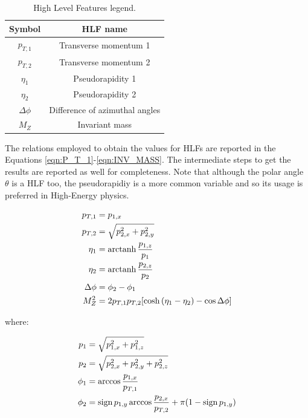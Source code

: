 \begin{table}[H]
	\begin{center}
		\begin{tabular}{c c}
			\toprule
			Symbol	&	HLF name	\\
			\midrule
			$p_{T,1}$		&	Transverse momentum 1			\\
			$p_{T,2}$		&	Transverse momentum 2			\\
			$\eta_{1}$		&	Pseudorapidity 1				\\
			$\eta_{2}$		&	Pseudorapidity 2				\\
			$\Delta \phi$	&	Difference of azimuthal angles	\\
			$M_{Z}$			&	Invariant mass					\\
			\bottomrule
		\end{tabular}
		\caption{High Level Features legend.}
		\label{tab:HLF}
	\end{center}
\end{table}

The relations employed to obtain the values for HLFs are reported in the Equations \ref{eqn:P_T_1}-\ref{eqn:INV_MASS}. The intermediate steps to get the results are reported as well for completeness. Note that although the polar angle $\theta$ is a HLF too, the pseudorapidiy is a more common variable and so its usage is preferred in High-Energy physics.

\begin{align}
	p_{T,1} &= p_{1,x}	\label{eqn:P_T_1}	\\
	p_{T,2} &= \sqrt{ p_{2,x}^2 + p_{2,y}^2 }	\label{eqn:P_T_2}	\\
	\eta_{1} &= \operatorname{arctanh}{ \frac{p_{1,z}}{p_{1}} }	\label{eqn:PR_1}	\\
	\eta_{2} &= \operatorname{arctanh}{ \frac{p_{2,z}}{p_{2}} }	\label{eqn:PR_2}	\\
	\Delta \phi &= \phi_{2} - \phi_{1}	\label{eqn:DELTA_PHI}	\\
	M_{Z}^{2} &= 2 p_{T,1} p_{T,2} [ \cosh{(\eta_{1} - \eta_{2})} - \cos{\Delta \phi} ]	\label{eqn:INV_MASS}
\end{align}

\noindent
where:

\begin{align}
	p_{1} &= \sqrt{ p_{1,x}^2 + p_{1,z}^2 }	\\
	p_{2} &= \sqrt{ p_{2,x}^2 + p_{2,y}^2 + p_{2,z}^2 }	\\
	\phi_{1} &= \arccos{ \frac{p_{1,x}}{p_{T,1}} }	\\
	\phi_{2} &= \operatorname{sign}{p_{1,y}} \arccos{ \frac{p_{2,x}}{p_{T,2}} } + \pi (1 - \operatorname{sign}{p_{1,y}})
\end{align}





